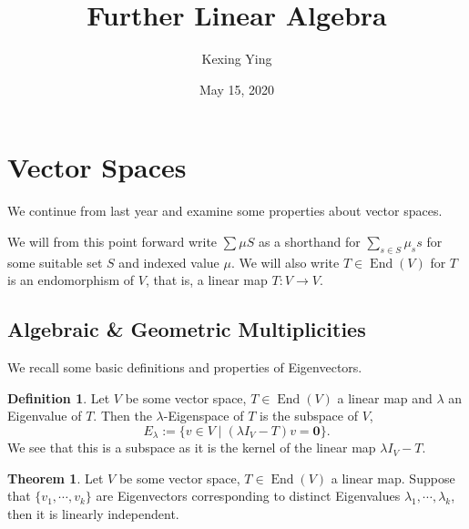 \documentclass[
]{article}
\title{Further Linear Algebra}
\author{Kexing Ying}
\date{May 15, 2020}
\theoremstyle{definition}
\newtheorem{theorem}{Theorem}
\theoremstyle{definition}
\newtheorem{definition}{Definition}[section]
\begin{document}
\maketitle

{
\hypersetup{linkcolor=}
\setcounter{tocdepth}{2}
\tableofcontents
}
\newpage

\hypertarget{vector-spaces}{%
\section{Vector Spaces}\label{vector-spaces}}

We continue from last year and examine some properties about vector
spaces.

We will from this point forward write \(\sum \mu S\) as a shorthand for
\(\sum_{s \in S} \mu_s s\) for some suitable set \(S\) and indexed value
\(\mu\). We will also write \(T \in \mathop{\mathrm{End}}(V)\) for \(T\)
is an endomorphism of \(V\), that is, a linear map \(T : V \to V\).

\hypertarget{algebraic-geometric-multiplicities}{%
\subsection{Algebraic \& Geometric
Multiplicities}\label{algebraic-geometric-multiplicities}}

We recall some basic definitions and properties of Eigenvectors.

\begin{definition}
  Let \(V\) be some vector space, \(T \in \mathop{\mathrm{End}}(V)\) a linear map and \(\lambda\) 
  an Eigenvalue of \(T\). Then the \(\lambda\)-Eigenspace of \(T\) is the 
  subspace of \(V\),
  \[E_\lambda := \{ v \in V \mid (\lambda I_V - T)v = \mathbf{0} \}.\]
  We see that this is a subspace as it is the kernel of the linear map 
  \(\lambda I_V - T\).
\end{definition}

\begin{theorem}\label{eigen_li}
  Let \(V\) be some vector space, \(T \in \mathop{\mathrm{End}}(V)\) a linear map. Suppose that 
  \(\{v_1, \cdots, v_k\}\) are Eigenvectors corresponding to distinct 
  Eigenvalues \(\lambda_1, \cdots, \lambda_k\), then it is linearly independent.
\end{theorem}
\proof
\end{document}
